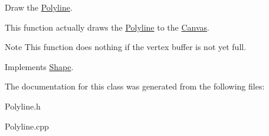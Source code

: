 Draw the \hyperlink{class_polyline}{Polyline}. 

This function actually draws the \hyperlink{class_polyline}{Polyline} to the \hyperlink{class_canvas}{Canvas}. \begin{DoxyNote}{Note}
This function does nothing if the vertex buffer is not yet full. 
\end{DoxyNote}


Implements \hyperlink{class_shape_afacc5aad8e37308c3ce8fef768199b05}{Shape}.



The documentation for this class was generated from the following files\+:\begin{DoxyCompactItemize}
\item 
Polyline.\+h\item 
Polyline.\+cpp\end{DoxyCompactItemize}
